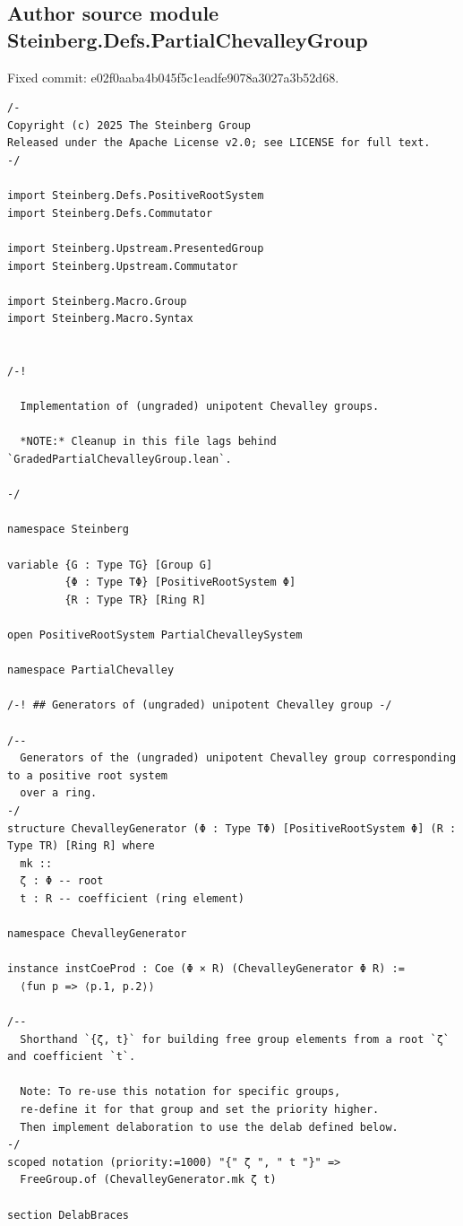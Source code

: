 \documentclass[10pt,a4paper]{article}
\begin{document}
\subsection*{Author source module Steinberg.Defs.PartialChevalleyGroup}
\noindent Fixed commit: e02f0aaba4b045f5c1eadfe9078a3027a3b52d68.
\begin{Verbatim}
/-
Copyright (c) 2025 The Steinberg Group
Released under the Apache License v2.0; see LICENSE for full text.
-/

import Steinberg.Defs.PositiveRootSystem
import Steinberg.Defs.Commutator

import Steinberg.Upstream.PresentedGroup
import Steinberg.Upstream.Commutator

import Steinberg.Macro.Group
import Steinberg.Macro.Syntax


/-!

  Implementation of (ungraded) unipotent Chevalley groups.

  *NOTE:* Cleanup in this file lags behind `GradedPartialChevalleyGroup.lean`.

-/

namespace Steinberg

variable {G : Type TG} [Group G]
         {Φ : Type TΦ} [PositiveRootSystem Φ]
         {R : Type TR} [Ring R]

open PositiveRootSystem PartialChevalleySystem

namespace PartialChevalley

/-! ## Generators of (ungraded) unipotent Chevalley group -/

/--
  Generators of the (ungraded) unipotent Chevalley group corresponding to a positive root system
  over a ring.
-/
structure ChevalleyGenerator (Φ : Type TΦ) [PositiveRootSystem Φ] (R : Type TR) [Ring R] where
  mk ::
  ζ : Φ -- root
  t : R -- coefficient (ring element)

namespace ChevalleyGenerator

instance instCoeProd : Coe (Φ × R) (ChevalleyGenerator Φ R) :=
  ⟨fun p => ⟨p.1, p.2⟩⟩

/--
  Shorthand `{ζ, t}` for building free group elements from a root `ζ` and coefficient `t`.

  Note: To re-use this notation for specific groups,
  re-define it for that group and set the priority higher.
  Then implement delaboration to use the delab defined below.
-/
scoped notation (priority:=1000) "{" ζ ", " t "}" =>
  FreeGroup.of (ChevalleyGenerator.mk ζ t)

section DelabBraces


\end{Verbatim}
\end{document}
